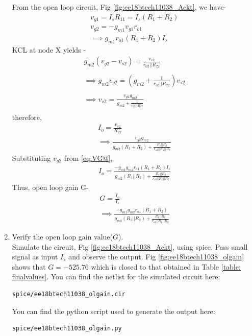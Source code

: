 \begin{enumerate}[label=\arabic*.,ref=\theenumi]
From the open loop circuit, Fig \ref{fig:ee18btech11038_Ackt}, we have-
\begin{align}
\label{eq:VG2}
    v_{g1} = I_{s}R_{11} = I_{s}(R_{1} + R_{2})\\
\label{eq:VG@}
    v_{g2} = -g_{m1}v_{g1}r_{o1}\\
    \implies g_{m1}r_{o1}(R_{1} + R_{2})I_{s}
\end{align}
KCL at node X yields -
\begin{align}
    g_{m2}(v_{g2} - v_{s2}) = \frac{v_{s2}}{r_{02}||R_{22}}\\ \\
    \implies g_{m2}v_{g2} = (g_{m2} + \frac{1}{r_{o2}||R_{22}})v_{s2}\\ \\
    \implies v_{s2} = \frac{v_{g2}g_{m2}}{g_{m2} + \frac{1}{r_{02}||R_{22}}}\\
\end{align}
therefore,
\begin{align}
    I_{o} = \frac{v_{s2}}{R_{22}}\\
    \implies \frac{v_{g2}g_{m2}}{g_{m2}(R_{1} + R_{2}) + \frac{R_{1}||R_{2}}{r_{o2}||R_{1}||R_{2}}}
\end{align}
Substituting $v_{g2}$ from \ref{eq:VG@},
\begin{align}
    I_{o} = \frac{-g_{m1}g_{m2}r_{o1}(R_{1} + R_{2})I_{s}}{g_{m2}(R_{1}||R_{2}) + \frac{R_{1}||R_{2}}{r_{o2}||R_{1}||R_{2}}}
\end{align}
Thus, open loop gain G- 
\begin{align}
    G = \frac{I_{o}}{I_{s}}\\
    \implies \frac{-g_{m1}g_{m2}r_{o1}(R_{1} + R_{2})}{g_{m2}(R_{1}||R_{2}) + \frac{R_{1}||R_{2}}{r_{o2}||R_{1}||R_{2}}}
\end{align}
\item Verify the open loop gain value($G$).\\
\solution Simulate the circuit, Fig \ref{fig:ee18btech11038_Ackt}, using spice. Pass small signal as input $I_{s}$ and observe the output. 
Fig \ref{fig:ee18btech11038_olgain} shows that $G = -525.76$ which is closed to that obtained in Table \ref{table: finalvalues}.
You can find the netlist for the simulated circuit here:
\begin{lstlisting}
spice/ee18btech11038_olgain.cir
\end{lstlisting}
You can find the python script used to generate the output here:
\begin{lstlisting}
spice/ee18btech11038_olgain.py
\end{lstlisting}


\end{enumerate}
